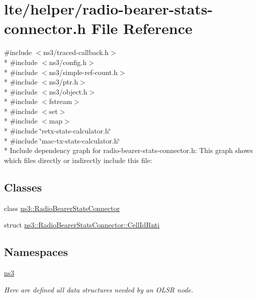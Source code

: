 \hypertarget{radio-bearer-stats-connector_8h}{}\section{lte/helper/radio-\/bearer-\/stats-\/connector.h File Reference}
\label{radio-bearer-stats-connector_8h}
{\ttfamily \#include $<$ns3/traced-\/callback.\+h$>$}\\*
{\ttfamily \#include $<$ns3/config.\+h$>$}\\*
{\ttfamily \#include $<$ns3/simple-\/ref-\/count.\+h$>$}\\*
{\ttfamily \#include $<$ns3/ptr.\+h$>$}\\*
{\ttfamily \#include $<$ns3/object.\+h$>$}\\*
{\ttfamily \#include $<$fstream$>$}\\*
{\ttfamily \#include $<$set$>$}\\*
{\ttfamily \#include $<$map$>$}\\*
{\ttfamily \#include \char`\"{}retx-\/stats-\/calculator.\+h\char`\"{}}\\*
{\ttfamily \#include \char`\"{}mac-\/tx-\/stats-\/calculator.\+h\char`\"{}}\\*
Include dependency graph for radio-\/bearer-\/stats-\/connector.h\+:
This graph shows which files directly or indirectly include this file\+:
\subsection*{Classes}
\begin{DoxyCompactItemize}
\item 
class \hyperlink{classns3_1_1RadioBearerStatsConnector}{ns3\+::\+Radio\+Bearer\+Stats\+Connector}
\item 
struct \hyperlink{structns3_1_1RadioBearerStatsConnector_1_1CellIdRnti}{ns3\+::\+Radio\+Bearer\+Stats\+Connector\+::\+Cell\+Id\+Rnti}
\end{DoxyCompactItemize}
\subsection*{Namespaces}
\begin{DoxyCompactItemize}
\item 
 \hyperlink{namespacens3}{ns3}
\begin{DoxyCompactList}\small\item\em Here are defined all data structures needed by an O\+L\+SR node. \end{DoxyCompactList}\end{DoxyCompactItemize}
